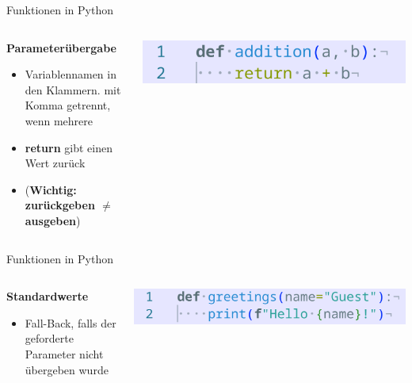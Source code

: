 \documentclass[aspectratio=169]{beamer}
\begin{document}
\begin{frame}{Funktionen in Python}
    \begin{columns}
        \begin{column}{0.5\textwidth}
            \textbf{Parameterübergabe}
            \begin{itemize}
                \item Variablennamen in den Klammern. mit Komma getrennt, wenn mehrere
                \item \textbf{return} gibt einen Wert zurück
                \item (\textbf{Wichtig: zurückgeben $\neq$ ausgeben})
            \end{itemize}
        \end{column}
        \begin{column}{0.5\textwidth}
            \begin{tcolorbox}[colframe=oxfordblue, colback=blue!10, coltitle=white, title=Python]
                \includegraphics[width=\textwidth]{images/code_inputandreturnfunction.png}
            \end{tcolorbox}
        \end{column}
    \end{columns}
\end{frame}

\begin{frame}{Funktionen in Python}
    \begin{columns}
        \begin{column}{0.5\textwidth}
            \textbf{Standardwerte}
            \begin{itemize}
                \item Fall-Back, falls der geforderte Parameter nicht übergeben wurde
            \end{itemize}
        \end{column}
        \begin{column}{0.5\textwidth}
            \begin{tcolorbox}[colframe=oxfordblue, colback=blue!10, coltitle=white, title=Python]
                \includegraphics[width=\textwidth]{images/code_fallbackparameterfunction.png}
            \end{tcolorbox}
        \end{column}
    \end{columns}
\end{frame}
\end{document}
